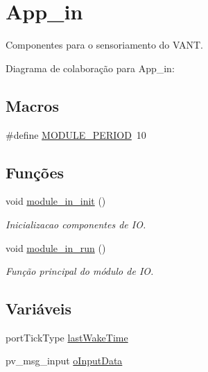 \hypertarget{group__app__in}{\section{App\-\_\-in}
\label{group__app__in}
}


Componentes para o sensoriamento do V\-A\-N\-T.  


Diagrama de colaboração para App\-\_\-in\-:
\subsection*{Macros}
\begin{DoxyCompactItemize}
\item 
\#define \hyperlink{group__app__in_ga0ac6c9f2991b096e49c354e5cce6fae0}{M\-O\-D\-U\-L\-E\-\_\-\-P\-E\-R\-I\-O\-D}~10
\end{DoxyCompactItemize}
\subsection*{Funções}
\begin{DoxyCompactItemize}
\item 
void \hyperlink{group__app__in_gaffe0980a750cbec13ebf241c933460dd}{module\-\_\-in\-\_\-init} ()
\begin{DoxyCompactList}\small\item\em Inicializacao componentes de I\-O. \end{DoxyCompactList}\item 
void \hyperlink{group__app__in_ga2b56089e4c5adb9ac8b7a41fc1a0b0b2}{module\-\_\-in\-\_\-run} ()
\begin{DoxyCompactList}\small\item\em Função principal do módulo de I\-O. \end{DoxyCompactList}\end{DoxyCompactItemize}
\subsection*{Variáveis}
\begin{DoxyCompactItemize}
\item 
port\-Tick\-Type \hyperlink{group__app__in_gaa8db3871cb5f64abbd94ddd5a1db73a6}{last\-Wake\-Time}
\item 
pv\-\_\-msg\-\_\-input \hyperlink{group__app__in_gaffc6f7805bab2d46af160c6f7715ba99}{o\-Input\-Data}
\end{DoxyCompactItemize}


